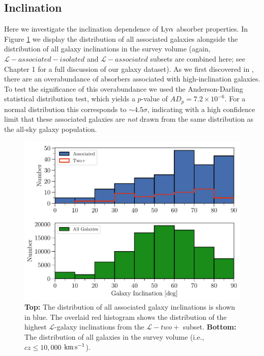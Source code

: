 \documentclass[twocolumn,tighten]{aastex62}
\newcommand{\kms}{$\rm km\, s^{-1}$}
\begin{document}
\subsection{Inclination}

Here we investigate the inclination dependence of $\rm Ly\alpha$ absorber properties. In Figure \ref{inc_hist} we display the distribution of all associated galaxies alongside the distribution of all galaxy inclinations in the survey volume (again, $\mathcal{L}-associated-isolated$ and $\mathcal{L}-associated$ subsets are combined here; see Chapter 1 for a full discussion of our galaxy dataset). As we first discovered in \cite{french2017}, there are an overabundance of absorbers associated with high-inclination galaxies. To test the significance of this overabundance we used the Anderson-Darling statistical distribution test, which yields a $p$-value of $AD_p = 7.2 \times 10^{-6}$. For a normal distribution this corresponds to $\sim 4.5 \sigma$, indicating with a high confidence limit that these associated galaxies are \emph{not} drawn from the same distribution as the all-sky galaxy population.

\begin{figure}
\centering
  \includegraphics[width=0.99\linewidth]{hist(adjustedInc)_associated_group_all_overlaid_double.pdf}
  \caption{\small{\textbf{Top:} The distribution of all associated galaxy inclinations is shown in blue. The overlaid red histogram shows the distribution of the highest $\mathcal{L}$-galaxy inclinations from the $\mathcal{L}-two+$ subset. \textbf{Bottom:} The distribution of all galaxies in the survey volume (i.e., $cz \leq 10,000$ \kms).}}
\label{inc_hist}
\vspace{0pt}
\end{figure}
\end{document}
